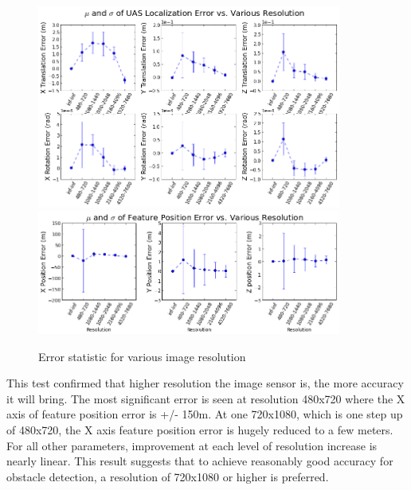 \begin{figure}[h]
  \centering
  \includegraphics[width=10cm,keepaspectratio=true]{./Figures/SimulationFigures/Figure50.png}
  \includegraphics[width=10cm,keepaspectratio=true]{./Figures/SimulationFigures/Figure49.png}
  \caption{Error statistic for various image resolution}
  \label{fig:simfig50}
\end{figure}

This test confirmed that higher resolution the image sensor is, the
more accuracy it will bring. The most significant error is seen at
resolution 480x720 where the X axis of feature position error is +/-
150m. At one 720x1080, which is one step up of 480x720, the X axis
feature position error is hugely reduced to a few meters. For all
other parameters, improvement at each level of resolution increase is
nearly linear. This result suggests that to achieve reasonably good
accuracy for obstacle detection, a resolution of 720x1080 or higher is
preferred. 


